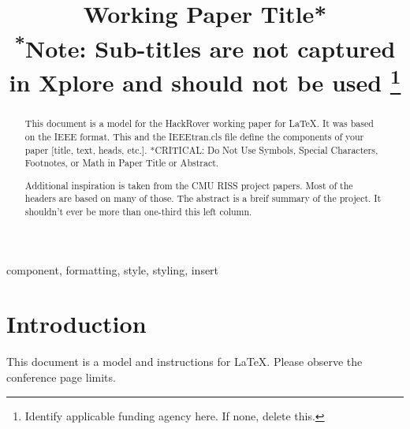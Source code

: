\documentclass[conference]{IEEEtran}
\begin{document}
\title{Working Paper Title*\\
{\footnotesize \textsuperscript{*}Note: Sub-titles are not captured in Xplore and
should not be used}
\thanks{Identify applicable funding agency here. If none, delete this.}
}

\author{
\and %
\and
{}
}

\maketitle

\begin{abstract}
This document is a model for the HackRover working paper for \LaTeX. It was based on the IEEE format. This and the IEEEtran.cls file define the components of your paper [title, text, heads, etc.]. *CRITICAL: Do Not Use Symbols, Special Characters, Footnotes, or Math in Paper Title or Abstract.

Additional inspiration is taken from the CMU RISS project papers. Most of the headers are based on many of those.
The abstract is a breif summary of the project. It shouldn't ever be more than one-third this left column.
\end{abstract}

\begin{IEEEkeywords}
component, formatting, style, styling, insert
\end{IEEEkeywords}

\section{Introduction}
This document is a model and instructions for \LaTeX.
Please observe the conference page limits. 
\end{document}
